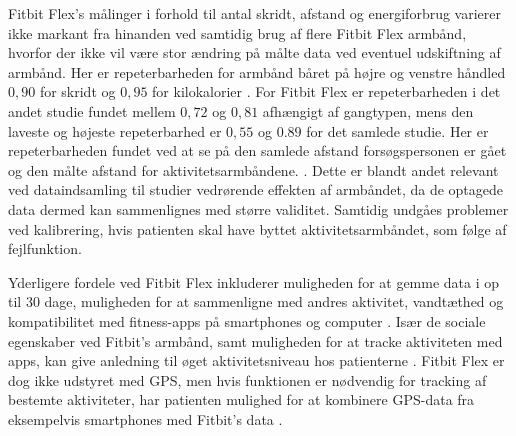 Fitbit Flex's målinger i forhold til antal skridt, afstand og energiforbrug varierer ikke markant fra hinanden ved samtidig brug af flere Fitbit Flex armbånd, hvorfor der ikke vil være stor ændring på målte data ved eventuel udskiftning af armbånd. Her er repeterbarheden for armbånd båret på højre og venstre håndled $0,90$ for skridt og $0,95$ for kilokalorier \citep{evenson2015}. For Fitbit Flex er repeterbarheden i det andet studie fundet mellem $0,72$ og $0,81$ afhængigt af gangtypen, mens den laveste og højeste repeterbarhed er $0,55$ og $0.89$ for det samlede studie. Her er repeterbarheden fundet ved at se på den samlede afstand forsøgspersonen er gået og den målte afstand for aktivitetsarmbåndene. \citep{kaewkannate2016}. Dette er blandt andet relevant ved dataindsamling til studier vedrørende effekten af armbåndet, da de optagede data dermed kan sammenlignes med større validitet. Samtidig undgåes problemer ved kalibrering, hvis patienten skal have byttet aktivitetsarmbåndet, som følge af fejlfunktion.

Yderligere fordele ved Fitbit Flex inkluderer muligheden for at gemme data i op til $30$ dage, muligheden for at sammenligne med andres aktivitet, vandtæthed og kompatibilitet med fitness-apps på smartphones og computer \citep{kaewkannate2016, fitbitflex}. Især de sociale egenskaber ved Fitbit's armbånd, samt muligheden for at tracke aktiviteten med apps, kan give anledning til øget aktivitetsniveau hos patienterne \citep{karapanos2016, rooksby2014}. Fitbit Flex er dog ikke udstyret med GPS, men hvis funktionen er nødvendig for tracking af bestemte aktiviteter, har patienten mulighed for at kombinere GPS-data fra eksempelvis smartphones med Fitbit's data \citep{fitbitflex}.